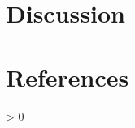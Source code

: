 \documentclass[
  english,
  man]{article}
\newlength{\cslhangindent}
\newenvironment{CSLReferences}[2] %
 {%
  \setlength{\parindent}{0pt}
  \ifodd #1 \everypar{\setlength{\hangindent}{\cslhangindent}}\ignorespaces\fi
  \ifnum #2 > 0
  \setlength{\parskip}{#2\baselineskip}
  \fi
 }%
 {}
\begin{document}
\hypertarget{discussion}{%
\section{Discussion}\label{discussion}}

\newpage

\hypertarget{references}{%
\section{References}\label{references}}

\begingroup
\setlength{\parindent}{-0.5in}
\setlength{\leftskip}{0.5in}

\hypertarget{refs}{}
\begin{CSLReferences}{0}{0}
\end{CSLReferences}

\endgroup
\end{document}
